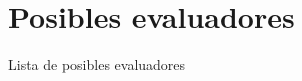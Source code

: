 \documentclass{standalone}
\begin{document}
	\section*{Posibles evaluadores}
	Lista de posibles evaluadores
\end{document}
